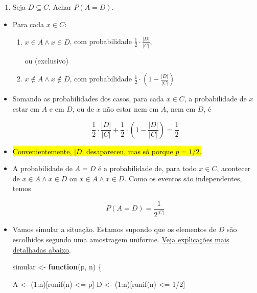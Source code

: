 \documentclass[
  11pt]{report}
\newenvironment{Shaded}{\begin{snugshade}}{\end{snugshade}}
\newcommand{\ControlFlowTok}[1]{\textcolor[rgb]{0.13,0.29,0.53}{\textbf{#1}}}
\newcommand{\DecValTok}[1]{\textcolor[rgb]{0.00,0.00,0.81}{#1}}
\newcommand{\FunctionTok}[1]{\textcolor[rgb]{0.00,0.00,0.00}{#1}}
\newcommand{\NormalTok}[1]{#1}
\newcommand{\OtherTok}[1]{\textcolor[rgb]{0.56,0.35,0.01}{#1}}
\newcommand{\SpecialCharTok}[1]{\textcolor[rgb]{0.00,0.00,0.00}{#1}}
\providecommand{\tightlist}{%
  \setlength{\itemsep}{0pt}\setlength{\parskip}{0pt}}
\renewenvironment{Shaded}{
    \begin{mdframed}[%
      roundcorner=2pt,%
      innerleftmargin=5pt,%
      innerrightmargin=5pt,%
      topline=true,%
      leftline=true,%
      rightline=true,%
      bottomline=true,%
      linewidth=0.5pt,%
      linecolor=black!20,%
      backgroundcolor=black!2,%
      skipabove=2ex,%
      skipbelow=2.5ex%
    ]%
  }
  {
    \end{mdframed}
  }
\begin{document}
\begin{rmdbox}

\begin{enumerate}
\def\labelenumi{\alph{enumi}.}
\tightlist
\item
  Seja $D \subseteq C$. Achar $P(A = D)$.
\end{enumerate}

\end{rmdbox}

\begin{itemize}
\item
  Para cada $x \in C$:

  \begin{enumerate}
  \def\labelenumi{\arabic{enumi}.}
  \item
    $x \in A \land x \in D$, com probabilidade $\frac12 \cdot \frac{|D|}{|C|}$,

    ou (exclusivo)
  \item
    $x \not\in A \land x \not\in D$, com probabilidade $\frac12 \cdot \left(1 - \frac{|D|}{|C|}\right)$
  \end{enumerate}
\item
  Somando as probabilidades dos casos, para cada $x \in C$, a probabilidade de $x$ estar em $A$ e em $D$, ou de $x$ não estar nem em $A$, nem em $D$, é

  \[
  \frac12 \cdot \frac{|D|}{|C|} + \frac12 \cdot \left(1 - \frac{|D|}{|C|}\right) = \frac12
  \]
\item
  {\hl{Convenientemente, $|D|$ desapareceu, mas só porque $p = 1/2$.}}
\item
  A probabilidade de $A = D$ é a probabilidade de, para todo $x \in C$, acontecer de $x \in A \land x \in D$ ou $x \in A \land x \in D$. Como os eventos são independentes, temos

  \[
  P(A = D) = \frac1{2^{|C|}}
  \]
\item
  Vamos simular a situação. Estamos supondo que os elementos de $D$ são escolhidos segundo uma amostragem uniforme. \protect\hyperlink{amostra}{Veja explicações mais detalhadas abaixo}.

\hypertarget{simular-amigos}{%
\label{simular-amigos}}%
\begin{Shaded}
\begin{Highlighting}[]
\NormalTok{simular }\OtherTok{\textless{}{-}} \ControlFlowTok{function}\NormalTok{(p, n) \{}

\NormalTok{  A }\OtherTok{\textless{}{-}}\NormalTok{ (}\DecValTok{1}\SpecialCharTok{:}\NormalTok{n)[}\FunctionTok{runif}\NormalTok{(n) }\SpecialCharTok{\textless{}=}\NormalTok{ p]}
\NormalTok{  D }\OtherTok{\textless{}{-}}\NormalTok{ (}\DecValTok{1}\SpecialCharTok{:}\NormalTok{n)[}\FunctionTok{runif}\NormalTok{(n) }\SpecialCharTok{\textless{}=} \DecValTok{1}\SpecialCharTok{/}\DecValTok{2}\NormalTok{]}


\end{Highlighting}
\end{Shaded}
\end{itemize}
\end{document}
